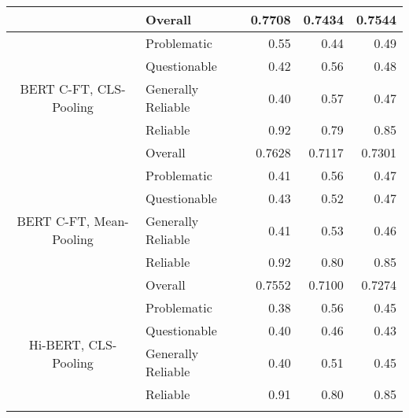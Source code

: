 \begin{table}[htbp]
\begin{longtable}{| c | l | r | r | r |}
                                                          & Overall            & 0.7708             & 0.7434          & 0.7544          \\
        \hline
        \multirow{5}{*}{BERT C-FT, CLS-Pooling}           & Problematic        & 0.55               & 0.44            & 0.49            \\
                                                          & Questionable       & 0.42               & 0.56            & 0.48            \\
                                                          & Generally Reliable & 0.40               & 0.57            & 0.47            \\
                                                          & Reliable           & 0.92               & 0.79            & 0.85            \\\cline{2-5}
                                                          & Overall            & 0.7628             & 0.7117          & 0.7301          \\
        \hline
        \multirow{5}{*}{BERT C-FT, Mean-Pooling}          & Problematic        & 0.41               & 0.56            & 0.47            \\
                                                          & Questionable       & 0.43               & 0.52            & 0.47            \\
                                                          & Generally Reliable & 0.41               & 0.53            & 0.46            \\
                                                          & Reliable           & 0.92               & 0.80            & 0.85            \\\cline{2-5}
                                                          & Overall            & 0.7552             & 0.7100          & 0.7274          \\
        \hline
        \multirow{5}{*}{Hi-BERT, CLS-Pooling}             & Problematic        & 0.38               & 0.56            & 0.45            \\
                                                          & Questionable       & 0.40               & 0.46            & 0.43            \\
                                                          & Generally Reliable & 0.40               & 0.51            & 0.45            \\
                                                          & Reliable           & 0.91               & 0.80            & 0.85            \\\cline{2-5}

\end{longtable}
\end{table}
